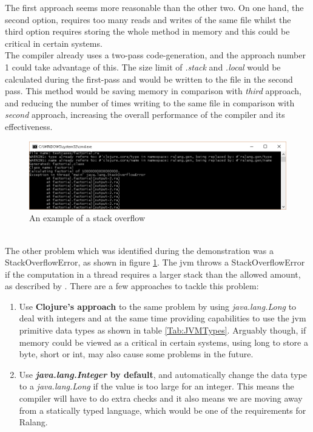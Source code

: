 \documentclass[a4paper]{article}
\begin{document}
	The first approach seems more reasonable than the other two. On one hand, the second option, requires too many reads and writes of the same file whilst the third option requires storing the whole method in memory and this could be critical in certain systems.\\
	
	The compiler already uses a two-pass code-generation, and the approach number 1 could take advantage of this. The size limit of \textit{.stack} and \textit{.local} would be calculated during the first-pass and would be written to the file in the second pass. This method would be saving memory in comparison with \textit{third} approach, and reducing the number of times writing to the same file in comparison with \textit{second} approach, increasing the overall performance of the compiler and its effectiveness.
	\begin{figure}[h!]
		\centering
		\includegraphics[width=\linewidth]{images/stack_overflow_sample.png}
		\caption{An example of a stack overflow}
		\label{fig:stack_overflow}
	\end{figure}\\
	The other problem which was identified during the demonstration was a StackOverflowError, as shown in figure \ref{fig:stack_overflow}. The \ac{jvm} throws a StackOverflowError if the computation in a thread requires a larger stack than the allowed amount, as described by \cite{JVMSpec}. There are a few approaches to tackle this problem:
	\begin{enumerate}
		\item Use \textbf{Clojure's approach} to the same problem by using \textit{java.lang.Long} to deal with integers and at the same time providing capabilities to use the \ac{jvm} primitive data types as shown in table \ref{Tab:JVMTypes}. Arguably though, if memory could be viewed as a critical in certain systems, using long to store a byte, short or int, may also cause some problems in the future. \parencite{TypedClojure}
		\item Use \textbf{\textit{java.lang.Integer} by default}, and automatically change the data type to a \textit{java.lang.Long} if the value is too large for an integer. This means the compiler will have to do extra checks and it also means we are moving away from a statically typed language, which would be one of the requirements for Ralang.
	\end{enumerate}
\end{document}
